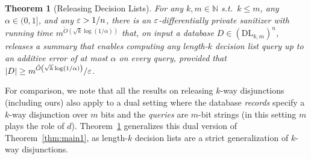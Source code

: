\documentclass[11pt]{article}
\newcommand\N{\mathbb{N}}
\newtheorem{theorem}{Theorem}[section]
\theoremstyle{definition}
\begin{document}
\begin{theorem}[Releasing Decision Lists] \label{thm:main3}
For any $k, m \in \N$ s.t.~$k \leq m$, any $\alpha \in (0,1]$, and any $\varepsilon > 1/n$, there is an $\varepsilon$-differentially private sanitizer with running time $m^{\tilde{O}\left(\sqrt{k}\log(1/\alpha)\right)}$ that, on input a database $D \in (\mathrm{DL}_{k,m})^n$, releases a summary that enables computing any length-$k$ decision list query up to an additive error of at most $\alpha$ on every query, provided that $|D| \geq m^{\tilde{O}\left(\sqrt{k} \log(1/\alpha)\right)}/\varepsilon$.
\end{theorem}

For comparison, we note that all the results on releasing $k$-way disjunctions (including ours) also apply to a dual setting where the database \emph{records} specify a $k$-way disjunction over $m$ bits and the \emph{queries} are $m$-bit strings (in this setting $m$ plays the role of $d$).  Theorem~\ref{thm:main3} generalizes this dual version of Theorem~\ref{thm:main1}, as length-$k$ decision lists are a strict generalization of $k$-way disjunctions.
\end{document}
